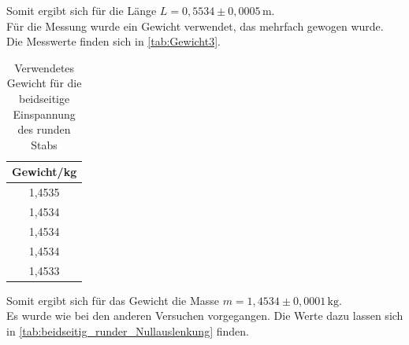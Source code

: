   Somit ergibt sich für die Länge $L = 0{,}5534 \pm 0,0005 \, \mathrm{m}$.\\

  Für die Messung wurde ein Gewicht verwendet, das mehrfach gewogen wurde. Die Messwerte finden sich in \autoref{tab:Gewicht3}.

  \begin{table}
    \centering
    \caption{Verwendetes Gewicht für die beidseitige Einspannung des runden Stabs}
    \label{tab:Gewicht3}
    \begin{tabular}{c}
      \toprule
      Gewicht/kg \\
      \midrule
      1,4535 \\
      1,4534 \\
      1,4534 \\
      1,4534 \\
      1,4533 \\
      \bottomrule
    \end{tabular}
  \end{table}

  Somit ergibt sich für das Gewicht die Masse $m = 1{,}4534 \pm 0,0001 \, \mathrm{kg}$.\\

  Es wurde wie bei den anderen Versuchen vorgegangen. Die Werte dazu lassen
  sich in \autoref{tab:beidseitig_runder_Nullauslenkung} finden.

